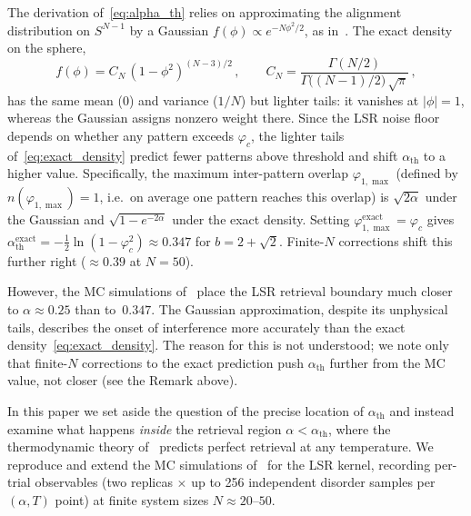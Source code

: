 \documentclass[11pt]{article}
\begin{document}
The derivation of~\eqref{eq:alpha_th} relies on approximating the alignment distribution on $S^{N-1}$ by a Gaussian $f(\phi) \propto e^{-N\phi^2/2}$, as in~\citet{ramsauer2021hopfield}.  The exact density on the sphere,
\begin{equation}
f(\phi) = C_N\,(1 - \phi^2)^{(N-3)/2}\,,\qquad
C_N = \frac{\Gamma(N/2)}{\Gamma\!\big((N\!-\!1)/2\big)\,\sqrt{\pi}}\,,
\label{eq:exact_density}
\end{equation}
has the same mean ($0$) and variance ($1/N$) but lighter tails: it vanishes at $|\phi| = 1$, whereas the Gaussian assigns nonzero weight there.  Since the LSR noise floor depends on whether any pattern exceeds $\varphi_c$, the lighter tails of~\eqref{eq:exact_density} predict fewer patterns above threshold and shift $\alpha_{\mathrm{th}}$ to a higher value.  Specifically, the maximum inter-pattern overlap $\varphi_{1,\max}$ (defined by $n(\varphi_{1,\max}) = 1$, i.e.\ on average one pattern reaches this overlap) is $\sqrt{2\alpha}$ under the Gaussian and $\sqrt{1-e^{-2\alpha}}$ under the exact density.  Setting $\varphi_{1,\max}^{\mathrm{exact}} = \varphi_c$ gives $\alpha_{\mathrm{th}}^{\mathrm{exact}} = -\tfrac{1}{2}\ln(1-\varphi_c^2) \approx 0.347$ for $b = 2+\sqrt{2}$.  Finite-$N$ corrections shift this further right ($\approx 0.39$ at $N = 50$).

\noindent However, the MC simulations of~\citet{iclr2026mc} place the LSR retrieval boundary much closer to $\alpha \approx 0.25$ than to~$0.347$.  The Gaussian approximation, despite its unphysical tails, describes the onset of interference more accurately than the exact density~\eqref{eq:exact_density}.  The reason for this is not understood; we note only that finite-$N$ corrections to the exact prediction push $\alpha_{\mathrm{th}}$ further from the MC value, not closer (see the Remark above).

In this paper we set aside the question of the precise location of $\alpha_{\mathrm{th}}$ and instead examine what happens \emph{inside} the retrieval region $\alpha < \alpha_{\mathrm{th}}$, where the thermodynamic theory of~\citet{icml2026theory} predicts perfect retrieval at any temperature.  We reproduce and extend the MC simulations of~\citet{iclr2026mc} for the LSR kernel, recording per-trial observables (two replicas $\times$ up to 256 independent disorder samples per $(\alpha, T)$ point) at finite system sizes $N \approx 20$--$50$.
\end{document}
